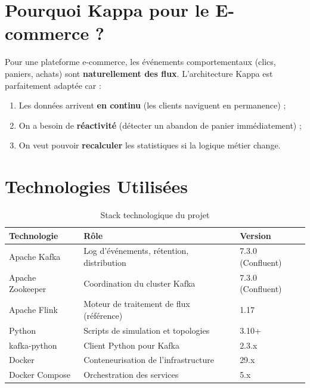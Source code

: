 \section{Pourquoi Kappa pour le E-commerce ?}

Pour une plateforme e-commerce, les événements comportementaux (clics, paniers, achats) sont \textbf{naturellement des flux}. L'architecture Kappa est parfaitement adaptée car :

\begin{enumerate}
    \item Les données arrivent \textbf{en continu} (les clients naviguent en permanence) ;
    \item On a besoin de \textbf{réactivité} (détecter un abandon de panier immédiatement) ;
    \item On veut pouvoir \textbf{recalculer} les statistiques si la logique métier change.
\end{enumerate}

\section{Technologies Utilisées}

\begin{table}[H]
\centering
\begin{tabularx}{\textwidth}{L{3.5cm} X C{2.5cm}}
\toprule
\textbf{\color{primarycolor}Technologie} &
\textbf{\color{primarycolor}Rôle} &
\textbf{\color{primarycolor}Version} \\
\midrule
Apache Kafka & Log d'événements, rétention, distribution & 7.3.0 (Confluent) \\
\addlinespace[0.1cm]
Apache Zookeeper & Coordination du cluster Kafka & 7.3.0 (Confluent) \\
\addlinespace[0.1cm]
Apache Flink & Moteur de traitement de flux (référence) & 1.17 \\
\addlinespace[0.1cm]
Python & Scripts de simulation et topologies & 3.10+ \\
\addlinespace[0.1cm]
kafka-python & Client Python pour Kafka & 2.3.x \\
\addlinespace[0.1cm]
Docker & Conteneurisation de l'infrastructure & 29.x \\
\addlinespace[0.1cm]
Docker Compose & Orchestration des services & 5.x \\
\bottomrule
\end{tabularx}
\caption{Stack technologique du projet}
\end{table}
